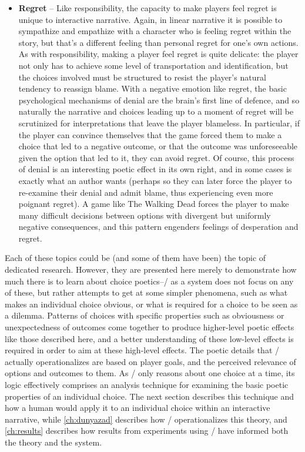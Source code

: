 \begin{itemize}
  \item \textbf{Regret} -- Like responsibility, the capacity to make players feel regret is unique to interactive narrative.
%
Again, in linear narrative it is possible to sympathize and empathize with a character who is feeling regret within the story, but that's a different feeling than personal regret for one's own actions.
%
As with responsibility, making a player feel regret is quite delicate: the player not only has to achieve some level of transportation and identification, but the choices involved must be structured to resist the player's natural tendency to reassign blame.
%
With a negative emotion like regret, the basic psychological mechanisms of denial are the brain's first line of defence, and so naturally the narrative and choices leading up to a moment of regret will be scrutinized for interpretations that leave the player blameless.
%
In particular, if the player can convince themselves that the game forced them to make a choice that led to a negative outcome, or that the outcome was unforeseeable given the option that led to it, they can avoid regret.
%
Of course, this process of denial is an interesting poetic effect in its own right, and in some cases is exactly what an author wants (perhaps so they can later force the player to re-examine their denial and admit blame, thus experiencing even more poignant regret).
%
A game like The Walking Dead \citep{TheWalkingDead} forces the player to make many difficult decisions between options with divergent but uniformly negative consequences, and this pattern engenders feelings of desperation and regret.

\end{itemize}


Each of these topics could be (and some of them have been) the topic of dedicated research.
%
However, they are presented here merely to demonstrate how much there is to learn about choice poetics--\dunyazad/ as a system does not focus on any of these, but rather attempts to get at some simpler phenomena, such as what makes an individual choice obvious, or what is required for a choice to be seen as a dilemma.
%
Patterns of choices with specific properties such as obviousness or unexpectedness of outcomes come together to produce higher-level poetic effects like those described here, and a better understanding of these low-level effects is required in order to aim at these high-level effects.
%
The poetic details that \dunyazad/ actually operationalizes are based on player goals, and the perceived relevance of options and outcomes to them.
%
As \dunyazad/ only reasons about one choice at a time, its logic effectively comprises an analysis technique for examining the basic poetic properties of an individual choice.
%
The next section describes this technique and how a human would apply it to an individual choice within an interactive narrative, while \cref{ch:dunyazad} describes how \dunyazad/ operationalizes this theory, and \cref{ch:results} describes how results from experiments using \dunyazad/ have informed both the theory and the system.

